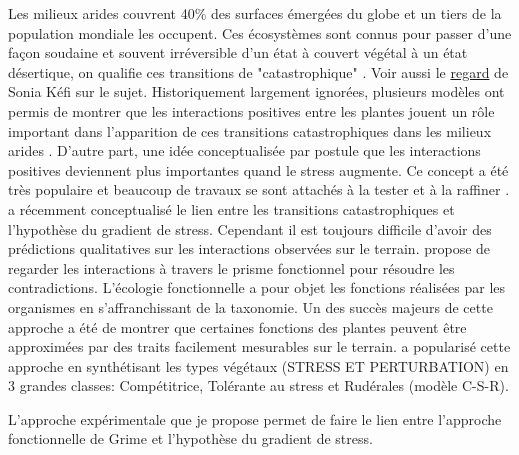 \documentclass[12pt]{article} %
\begin{document}
Les milieux arides couvrent 40\% des surfaces émergées du globe et un tiers de la population mondiale les occupent. Ces écosystèmes sont connus pour passer d'une façon soudaine et souvent irréversible d'un  état à couvert végétal à un état désertique, on qualifie ces transitions de "catastrophique" \citep{Scheffer2001,Kefi2007}. Voir aussi le \href{http://www.sfecologie.org/regards/2012/10/19/r37-hysteresis-sonia-kefi/}{regard} de Sonia Kéfi sur le sujet. Historiquement largement ignorées, plusieurs modèles ont permis de montrer que les interactions positives entre les plantes jouent un rôle important dans l'apparition de ces transitions catastrophiques dans les milieux arides \citep{Kefi2007,Kefi2007a,Rietkerk2004}. D'autre part, une idée conceptualisée par \citet{Bertness1994} postule que les interactions positives deviennent plus importantes quand le stress augmente. Ce concept a été très populaire et beaucoup de travaux se sont attachés à la tester et à la raffiner \citep{ Michalet2007,Maestre2009,He2013}. \citep{Verwijmeren2013} a récemment conceptualisé le lien entre les transitions catastrophiques et l'hypothèse du gradient de stress. Cependant il est toujours difficile d'avoir des prédictions qualitatives sur les interactions observées sur le terrain. \citet{Butterfield2013} propose de regarder les interactions à travers le prisme fonctionnel pour résoudre les contradictions. L'écologie fonctionnelle a pour objet les fonctions réalisées par les organismes en s'affranchissant de la taxonomie. Un des succès majeurs de cette approche a été de montrer que certaines fonctions des plantes peuvent être approximées par des traits facilement mesurables sur le terrain. \citet{Grime1977a} a popularisé cette approche en synthétisant les types végétaux (STRESS ET PERTURBATION) en 3 grandes classes: Compétitrice, Tolérante au stress et Rudérales (modèle C-S-R).

L'approche expérimentale que je propose permet de faire le lien entre l'approche fonctionnelle de Grime et l'hypothèse du gradient de stress.


\printbibliography
\end{document}
